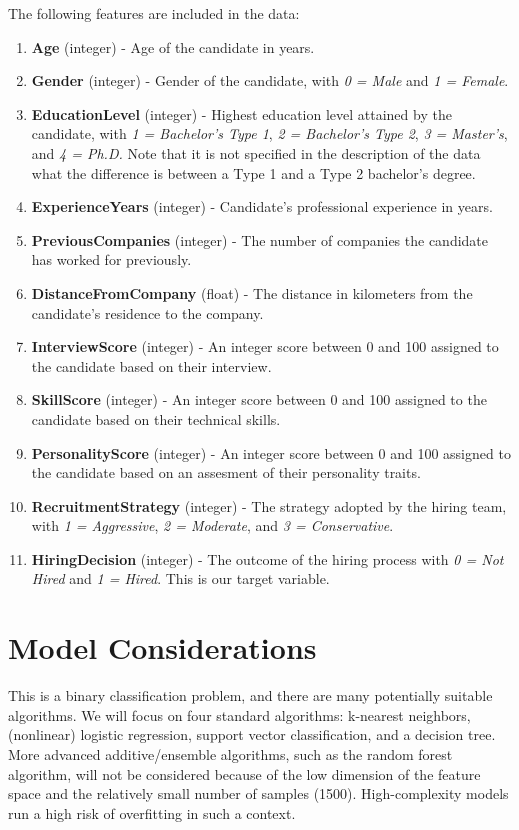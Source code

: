 \documentclass[12pt]{article}
\begin{document}
The following features are included in the data:
\begin{enumerate}
\item {\bf Age} (integer) - Age of the candidate in years.
\item {\bf Gender} (integer) - Gender of the candidate, with {\it 0 = Male} and {\it 1 = Female}.
\item {\bf EducationLevel} (integer) - Highest education level attained by the candidate, with {\it 1 = Bachelor's Type 1}, {\it 2 = Bachelor's Type 2}, {\it 3 = Master's}, and {\it 4 = Ph.D.} Note that it is not specified in the description of the data what the difference is between a Type 1 and a Type 2 bachelor's degree.
\item {\bf ExperienceYears} (integer) - Candidate's professional experience in years.
\item {\bf PreviousCompanies} (integer) - The number of companies the candidate has worked for previously.
\item {\bf DistanceFromCompany} (float) - The distance in kilometers from the candidate's residence to the company.
\item {\bf InterviewScore} (integer) - An integer score between 0 and 100 assigned to the candidate based on their interview.
\item {\bf SkillScore} (integer) - An integer score between 0 and 100 assigned to the candidate based on their technical skills.
\item {\bf PersonalityScore} (integer) - An integer score between 0 and 100 assigned to the candidate based on an assesment of their personality traits.
\item {\bf RecruitmentStrategy} (integer) - The strategy adopted by the hiring team, with {\it 1 = Aggressive}, {\it 2 = Moderate}, and {\it 3 = Conservative}.
\item {\bf HiringDecision} (integer) - The outcome of the hiring process with {\it 0 = Not Hired} and {\it 1 = Hired}. This is our target variable.
\end{enumerate}

\section{Model Considerations}

This is a binary classification problem, and there are many potentially suitable algorithms. We will focus on four standard algorithms: k-nearest neighbors, (nonlinear) logistic regression, support vector classification, and a decision tree. More advanced additive/ensemble algorithms, such as the random forest algorithm, will not be considered because of the low dimension of the feature space and the relatively small number of samples (1500). High-complexity models run a high risk of overfitting in such a context.
\end{document}
